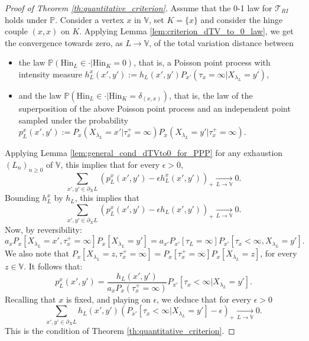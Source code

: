 \documentclass[12pt,a4paper]{article}
\newcommand{\1}[1]{{\mathbf 1}{\{#1\}}}
\newcommand{\8}{{\infty}}
\newcommand{\Hin}{\mathrm{Hin}}
\begin{document}
\begin{proof}[Proof of Theorem \ref{th:quantitative_criterion}]
Assume that the 0-1 law for $\mathcal{T}_{RI}$ holds under $\mathbb{P}$. Consider a vertex $x$ in $\mathbb{V}$, set $K=\{x\}$ and consider the hinge couple $(x,x)$ on $K$. Applying Lemma \ref{lem:criterion_dTV_to_0_law}, we get the convergence towards zero, as $L\to\mathbb{V}$, of the total variation distance between 
\begin{itemize}
  \item the law 
  $\mathbb{P}(\Hin_L \in \cdot | \Hin_K=0)$, that is, a Poisson point process with intensity measure 
  $h_{L}^{x}(x',y') := h_L(x',y') P_{x'}(\tau_x=\infty|X_{\lambda_L}=y')$,
  \item and the law 
  $\mathbb{P}(\Hin_L \in \cdot | \Hin_K=\delta_{(x,x)})$, that is, the law of the superposition of the above Poisson point process and an independent point sampled under the probability 
  $p_{L}^{x}(x', y'):= P_x(X_{\lambda_L}= x'| \tau_x^+=\infty) P_x(X_{\lambda_L}= y'| \tau_x^+=\infty)$.
\end{itemize}
Applying Lemma \ref{lem:general_cond_dTVto0_for_PPP} for any exhaustion $(L_n)_{n\ge 0}$ of $\mathbb{V}$, this implies that for every $\epsilon>0$, 
\begin{equation}
  \sum_{x',y' \in \partial_X L} 
  \left(p_{L}^{ x}(x', y') 
  - \epsilon h_{L}^{x}(x',y') \right)_+  \underset{L \to \mathbb{V}}\longrightarrow 0.
\end{equation}
Bounding $h_{L}^{x}$ by $h_L$, this implies that  
\begin{equation}
  \sum_{x',y'\in  \partial_X L} 
  \left(p_{L}^{x}(x', y')  - \epsilon h_L(x', y')   \right)_+  
  \underset{L \to \mathbb{V}}{\longrightarrow} 0.
\end{equation}
Now, by reversibility:
\begin{equation}
  a_x  P_x[X_{\lambda_L}=x', \tau_x^+=\infty]    P_x[X_{\lambda_L}=y']  = a_{x'} P_{x'}[\tau_L=\infty]  P_{x'}[\tau_x < \infty, X_{  \lambda_L}=y'].
\end{equation}
We also note that $P_x[X_{\lambda_L} = z,\tau_x^+=\infty]= P_x[\tau_x^+=\infty] P_x[X_{\lambda_L} = z]$, for every $z\in \mathbb{V}$.
It follows that:
\begin{equation}\label{eq:rewrite_proba_induced_hinges_singleton}
 p_{L}^x(x', y') =  \frac{h_L(x', y')}{a_x P_x(\tau_x^+=\infty) } 
  P_{x'}[\tau_x < \infty | X_{\lambda_L}=y'].
\end{equation}
Recalling that $x$ is fixed, and playing on $\epsilon$, we deduce that for every $\epsilon>0$
\begin{equation}
  \sum_{x',y' \in \partial_X L} 
  h_L(x', y')
  \left(P_{x'}[\tau_x < \infty | X_{\lambda_L}=y']
  - \epsilon  \right)_+  \underset{L \to \mathbb{V}}{\longrightarrow} 0.
\end{equation}
This is the condition of Theorem \ref{th:quantitative_criterion}.


\end{proof}
\end{document}
